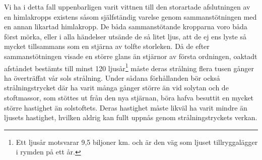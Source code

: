 \documentclass[a4paper, 12pt, oneside, swedish]{article}
\begin{document}
Vi ha i detta fall uppenbarligen varit vittnen till den storartade afslutningen av en himlakropps existens såsom själfständig varelse genom sammanstötningen med en annan likartad himlakropp. De båda sammanstötande kropparna voro båda först mörka, eller i alla händelser utsände de så litet ljus, att de ej ens lyste så mycket tillsammans som en stjärna av tolfte storleken. Då de efter sammanstötningen visade en större glans än stjärnor av första ordningen, oaktadt afståndet bestämts till minst 120 ljusår\footnote{Ett ljusår motsvarar 9,5 biljoner km. och är den väg som ljuset tillryggalägger i rymden på ett år.} måste deras strålning flera tusen gånger ha överträffat vår sols strålning. Under sådana förhållanden bör också strålningstrycket där ha varit många gånger större än vid solytan och de stoftmassor, som stöttes ut från den nya stjärnan, böra hafva besuttit en mycket större hastighet än solstoftets. Deras hastighet måste likväl ha varit mindre än ljusets hastighet, hvilken aldrig kan fullt uppnås genom strålningstryckets verkan.
\end{document}
